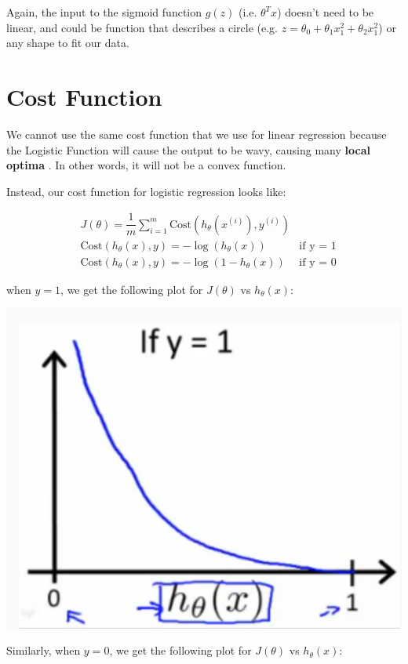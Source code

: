 \documentclass[10pt,a4paper,UTF8]{article}
\begin{document}
Again, the input to the sigmoid function \(g(z)\) (i.e. \(\theta^{T}x\)) doesn't need to be linear, and could be function that describes a circle (e.g. \(z = \theta_{0} + \theta_{1}x_{1}^{2} + \theta_{2}x_{1}^{2}\)) or any shape to fit our data.
\section{Cost Function}
\label{sec:org8130664}


We cannot use the same cost function that we use for linear regression because the Logistic Function will cause the output to be wavy, causing many \textbf{local optima} . In other words, it will not be a convex function.

Instead, our cost function for logistic regression looks like:

\begin{align*}& J(\theta) = \dfrac{1}{m} \sum_{i=1}^m \mathrm{Cost}(h_\theta(x^{(i)}),y^{(i)}) \\ & \mathrm{Cost}(h_\theta(x),y) = -\log(h_\theta(x)) \; & \text{if y = 1} \\ & \mathrm{Cost}(h_\theta(x),y) = -\log(1-h_\theta(x)) \; & \text{if y = 0}\end{align*}

when \(y=1\), we get the following plot for \(J(\theta)\) vs \(h_{\theta}(x)\):

\begin{center}
\includegraphics[width=.9\linewidth]{../../img/computer_ng/20171008costFunction1.png}
\end{center}

Similarly, when \(y=0\), we get the following plot for \(J(\theta)\) vs \(h_{\theta}(x)\):
\end{document}

